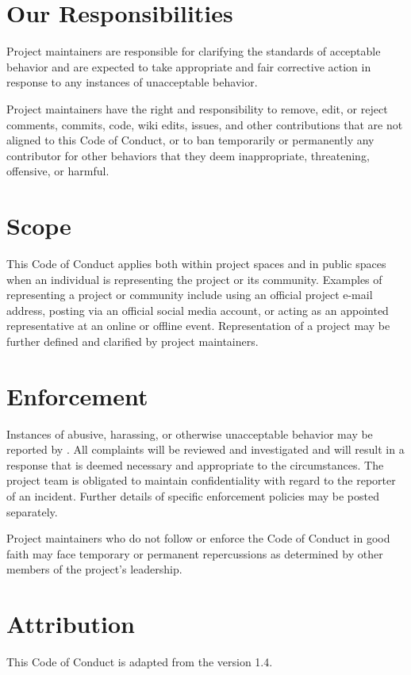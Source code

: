 \section{Our Responsibilities}\label{s:conduct-responsibilities}

Project maintainers are responsible for clarifying the standards of
acceptable behavior and are expected to take appropriate and fair
corrective action in response to any instances of unacceptable
behavior.

Project maintainers have the right and responsibility to remove, edit,
or reject comments, commits, code, wiki edits, issues, and other
contributions that are not aligned to this Code of Conduct, or to ban
temporarily or permanently any contributor for other behaviors that
they deem inappropriate, threatening, offensive, or harmful.

\section{Scope}\label{s:conduct-scope}

This Code of Conduct applies both within project spaces and in public
spaces when an individual is representing the project or its
community. Examples of representing a project or community include
using an official project e-mail address, posting via an official
social media account, or acting as an appointed representative at an
online or offline event. Representation of a project may be further
defined and clarified by project maintainers.

\section{Enforcement}\label{s:conduct-enforcement}

Instances of abusive, harassing, or otherwise unacceptable behavior
may be reported by . All
complaints will be reviewed and investigated and will result in a
response that is deemed necessary and appropriate to the
circumstances. The project team is obligated to maintain
confidentiality with regard to the reporter of an incident. Further
details of specific enforcement policies may be posted separately.

Project maintainers who do not follow or enforce the Code of Conduct
in good faith may face temporary or permanent repercussions as
determined by other members of the project's leadership.

\section{Attribution}\label{s:conduct-attribution}

This Code of Conduct is adapted from
the  version 1.4.
